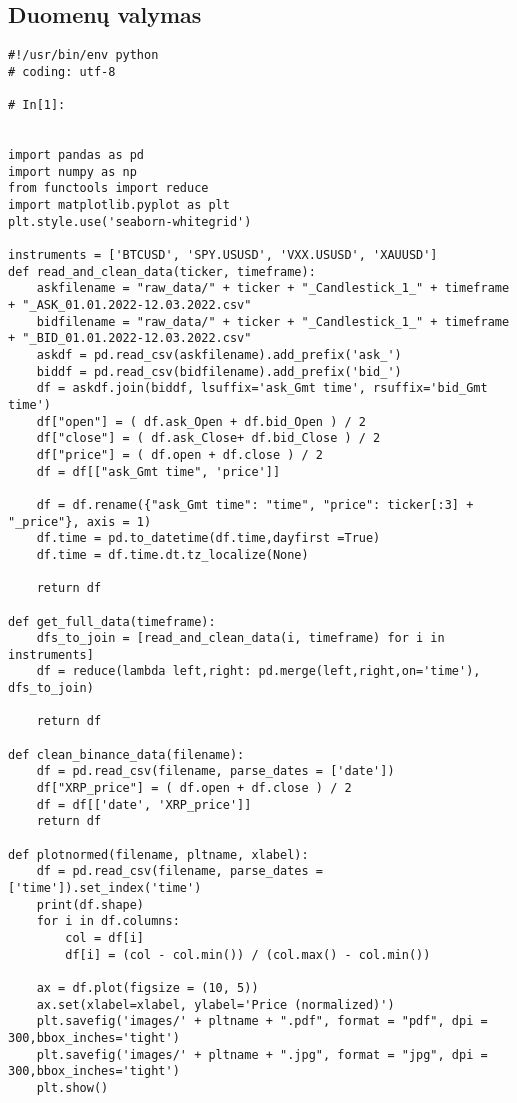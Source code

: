 \documentclass[12pt,a4paper]{article}
\begin{document}
\subsection{Duomenų valymas}
\lstset{language=Python}
\lstset{frame=lines}
\lstset{basicstyle=\footnotesize}
\begin{lstlisting}[breaklines]
#!/usr/bin/env python
# coding: utf-8

# In[1]:


import pandas as pd
import numpy as np
from functools import reduce
import matplotlib.pyplot as plt
plt.style.use('seaborn-whitegrid')

instruments = ['BTCUSD', 'SPY.USUSD', 'VXX.USUSD', 'XAUUSD']
def read_and_clean_data(ticker, timeframe):
    askfilename = "raw_data/" + ticker + "_Candlestick_1_" + timeframe + "_ASK_01.01.2022-12.03.2022.csv"
    bidfilename = "raw_data/" + ticker + "_Candlestick_1_" + timeframe + "_BID_01.01.2022-12.03.2022.csv"
    askdf = pd.read_csv(askfilename).add_prefix('ask_')
    biddf = pd.read_csv(bidfilename).add_prefix('bid_')
    df = askdf.join(biddf, lsuffix='ask_Gmt time', rsuffix='bid_Gmt time')
    df["open"] = ( df.ask_Open + df.bid_Open ) / 2
    df["close"] = ( df.ask_Close+ df.bid_Close ) / 2
    df["price"] = ( df.open + df.close ) / 2
    df = df[["ask_Gmt time", 'price']]
    
    df = df.rename({"ask_Gmt time": "time", "price": ticker[:3] + "_price"}, axis = 1)
    df.time = pd.to_datetime(df.time,dayfirst =True)
    df.time = df.time.dt.tz_localize(None)

    return df

def get_full_data(timeframe):
    dfs_to_join = [read_and_clean_data(i, timeframe) for i in instruments]
    df = reduce(lambda left,right: pd.merge(left,right,on='time'), dfs_to_join)

    return df

def clean_binance_data(filename):
    df = pd.read_csv(filename, parse_dates = ['date'])
    df["XRP_price"] = ( df.open + df.close ) / 2
    df = df[['date', 'XRP_price']]
    return df

def plotnormed(filename, pltname, xlabel):
    df = pd.read_csv(filename, parse_dates = ['time']).set_index('time')
    print(df.shape)
    for i in df.columns:
        col = df[i]
        df[i] = (col - col.min()) / (col.max() - col.min())
    
    ax = df.plot(figsize = (10, 5))
    ax.set(xlabel=xlabel, ylabel='Price (normalized)')
    plt.savefig('images/' + pltname + ".pdf", format = "pdf", dpi = 300,bbox_inches='tight')
    plt.savefig('images/' + pltname + ".jpg", format = "jpg", dpi = 300,bbox_inches='tight')
    plt.show()



\end{lstlisting}
\end{document}
